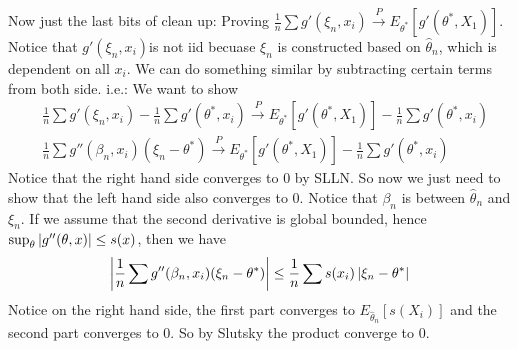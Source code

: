 Now just the last bits of clean up: Proving $\frac{1}{n}\sum g'(\xi_n, x_i) \overset{P}{\to} E_{\theta^*}[g'(\theta^*, X_1)]$. Notice that $g'(\xi_n, x_i)$is not iid becuase $\xi_n$ is constructed based on $\hat{\theta}_n$, which is dependent on all $x_i$. We can do something similar by subtracting certain terms from both side. i.e.: We want to show  
    \begin{align*}
        & \frac{1}{n}\sum g'(\xi_n, x_i) - \frac{1}{n} \sum g'(\theta^*, x_i)\overset{P}{\to} E_{\theta^*}[g'(\theta^*, X_1)] -  \frac{1}{n} \sum g'(\theta^*, x_i) \\
        & \frac{1}{n}\sum g''(\beta_n, x_i)(\xi_n - \theta^*) \overset{P}{\to} E_{\theta^*}[g'(\theta^*, X_1)] -  \frac{1}{n} \sum g'(\theta^*, x_i) \tag{By mean value theorem}
    \end{align*}
Notice that the right hand side converges to 0 by SLLN. So now we just need to show that the left hand side also converges to 0. Notice that $\beta_n$ is between $\hat{\theta}_n$ and $\xi_n$. If we assume that the second derivative is global bounded, hence $\sup_\theta \left| g''(\theta,x) \right| \leq s(x)$, then we have 
    \begin{align*}
        \left| \frac{1}{n}\sum g''(\beta_n, x_i)(\xi_n - \theta^*) \right| \leq \frac{1}{n}\sum s(x_i) \left| \xi_n - \theta^* \right|
    \end{align*}
Notice on the right hand side, the first part converges to $E_{\hat{\theta}_n}[s(X_i)]$ and the second part converges to 0. So by Slutsky the product converge to 0. 


